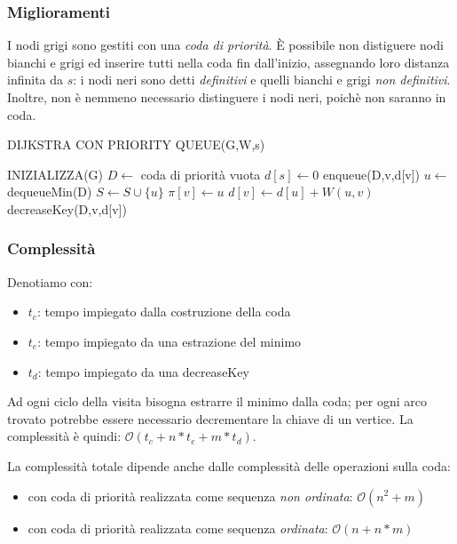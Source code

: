 \documentclass[11pt]{book}
\begin{document}
\subsubsection{Miglioramenti}
I nodi grigi sono gestiti con una \textit{coda di priorità}. È possibile non distiguere nodi bianchi e grigi ed inserire 
tutti nella coda fin dall'inizio, assegnando loro distanza infinita da $s$: i nodi neri sono detti \textit{definitivi} e 
quelli bianchi e grigi \textit{non definitivi}. Inoltre, non è nemmeno necessario distinguere i nodi neri, poichè non saranno 
in coda.
\begin{algorithm}[H]
    \caption{DIJKSTRA CON PRIORITY QUEUE(G,W,s)}
    \begin{algorithmic}
        \State INIZIALIZZA(G)
        \State $D\gets$ coda di priorità vuota
        \State $d[s]\gets 0$
            \State enqueue(D,v,d[v])
        \EndFor
            \State $u\gets$ dequeueMin(D)
            \State $S\gets S\cup\{u\}$
                    \State $\pi[v]\gets u$
                    \State $d[v]\gets d[u]+W(u,v)$
                    \State decreaseKey(D,v,d[v])
                \EndIf
            \EndFor
        \EndWhile
    \end{algorithmic}
\end{algorithm}
\subsubsection{Complessità}
Denotiamo con:
\begin{itemize}
    \item $t_c$: tempo impiegato dalla costruzione della coda 
    \item $t_e$: tempo impiegato da una estrazione del minimo 
    \item $t_d$: tempo impiegato da una decreaseKey
\end{itemize}
Ad ogni ciclo della visita bisogna estrarre il minimo dalla coda; per ogni arco trovato potrebbe essere necessario decrementare 
la chiave di un vertice. La complessità è quindi: $\mathcal{O}(t_c+n*t_e+m*t_d)$.

La complessità totale dipende anche dalle complessità delle operazioni sulla coda:
\begin{itemize}
    \item con coda di priorità realizzata come sequenza \textit{non ordinata}: $\mathcal{O}(n^2+m)$
    \item con coda di priorità realizzata come sequenza \textit{ordinata}: $\mathcal{O}(n+n*m)$
\end{itemize}
\end{document}
